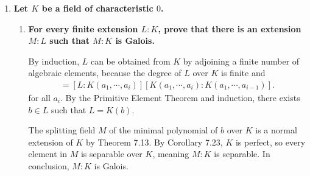 \documentclass[12pt]{article}
\DeclareMathOperator{\Gal}{Gal}
\begin{document}
\begin{enumerate}
    \item
        \boldmath\textbf{Let $K$ be a field of characteristic $0$.  
        }\unboldmath
        \begin{enumerate}
            \item
                \boldmath\textbf{For every finite extension $L:K$, prove that there is an extension $M:L$ such that $M:K$ is Galois.
                }\unboldmath \par
                \iffalse
                    Let $A \subset L$ be the smallest finite set such that $L = K(A)$. Let
                    \begin{align*}
                        B = \{ \sigma(\alpha) \mid \sigma \in \Gal(L : K), \alpha \in A \}
                    \end{align*}
                    and $q(x) = \prod_{\beta \in B} (x - \beta)$. $q(x)$ is invariant under $\Gal(L : K)$.
                \fi
                By induction, $L$ can be obtained from $K$ by adjoining a finite number of algebraic elements, because the degree of $L$ over $K$ is finite and
                \begin{align*}
                    [L : K] = [L : K(a_1, \cdots, a_i)][K(a_1, \cdots, a_i) : K(a_1, \cdots, a_{i - 1})].
                \end{align*}
                for all $a_i$. By the Primitive Element Theorem and induction, there exists $b \in L$ such that $L = K(b)$. \par
                The splitting field $M$ of the minimal polynomial of $b$ over $K$ is a normal extension of $K$ by Theorem 7.13. By Corollary 7.23, $K$ is perfect, so every element in $M$ is separable over $K$, meaning $M:K$ is separable. In conclusion, $M:K$ is Galois.


\end{enumerate}
\end{enumerate}
\end{document}
